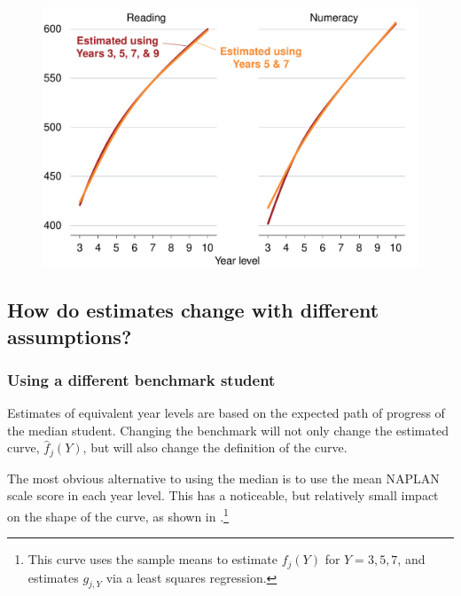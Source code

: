 \begin{figure}[H]
 \includegraphics[width=\columnwidth]{atlas/five_seven.pdf}\label{fig:57}

\end{figure}

\newpage
\subsection{How do estimates change with different assumptions?}

\subsubsection{Using a different benchmark student}

Estimates of equivalent year levels are based on the expected path of progress of the median student. Changing the benchmark will not only change the estimated curve, $\widehat{f}_{j}(Y)$, but will also change the definition of the curve.

The most obvious alternative to using the median is to use the mean NAPLAN scale score in each year level. This has a noticeable, but relatively small impact on the shape of the curve, as shown in .\footnote{This curve uses the sample means to estimate $f_{j}(Y)$ for $Y=3,5,7$, and estimates $g_{j,Y}$ via a least squares regression.}

